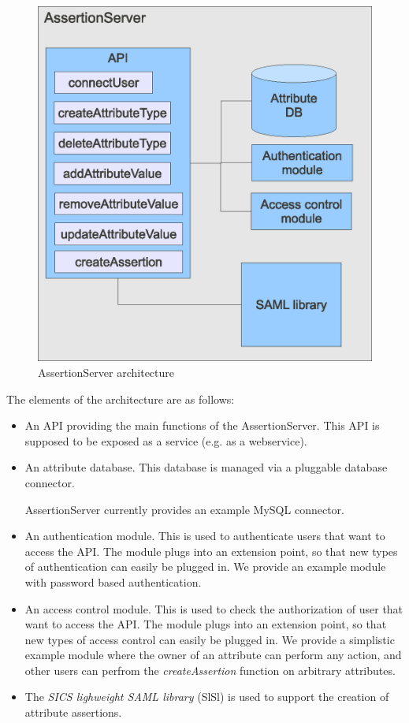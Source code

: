 \documentclass[10pt,a4paper]{article}
\begin{document}
\begin{figure}[ht!]
  \centering
  \includegraphics[scale=0.7]{ASarchitecture.eps}
  \caption{AssertionServer architecture}\label{arch}
\end{figure}

The elements of the architecture are as follows:

\begin{itemize}
  \item An API providing the main functions of the AssertionServer.
    This API is supposed to be exposed as a service (e.g. as a webservice).
  
  \item An attribute database. This database is managed via a pluggable 
    database connector.

    AssertionServer currently provides an example MySQL connector.
  
  \item An authentication module. This is used to authenticate users that want
    to access the API. The module plugs into an extension point, so that new
    types of authentication can easily be plugged in. We provide an example 
    module with password based authentication.
  
  \item An access control module. This is used to check the authorization of
    user that want to access the API. The module plugs into an extension point,
    so that new types of access control can easily be plugged in. We provide
    a simplistic example module where the owner of an attribute can perform
    any action, and other users can perfrom the \emph{createAssertion} function
    on arbitrary attributes.
   
  \item The \emph{SICS lighweight SAML library} (SlSl) is used to support the
    creation of attribute assertions.
\end{itemize}
\end{document}
